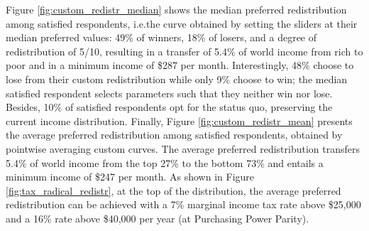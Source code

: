 \documentclass[12pt,english]{article}
\providecommand{\DIFaddtex}[1]{{\protect\color{blue}\uwave{#1}}} %
\providecommand{\DIFaddbegin}{} %
\providecommand{\DIFaddend}{} %
\providecommand{\DIFadd}[1]{\texorpdfstring{\DIFaddtex{#1}}{#1}} %
\providecommand{\DIFaddincludegraphics}[2][]{{\color{blue}\fbox{\DIFOincludegraphics[#1]{#2}}}} %
\DeclareRobustCommand{\DIFaddbegin}{\DIFOaddbegin \let\includegraphics\DIFaddincludegraphics} %
\DeclareRobustCommand{\DIFaddend}{\DIFOaddend \let\includegraphics\DIFOincludegraphics} %
\begin{document}


Figure \ref{fig:custom_redistr_median} shows the median preferred redistribution among satisfied respondents, i.e.\DIFaddbegin \DIFadd{, }\DIFaddend the curve obtained by setting the sliders at their median preferred values: 49\% of winners, 18\% of losers, and a degree of redistribution of 5/10, resulting in a transfer of 5.4\% of world income from rich to poor and in a minimum income of \$287 per month. 
Interestingly, 48\% choose to lose from their custom redistribution while only 9\% choose to win; the median satisfied respondent selects parameters such that they neither win nor lose. Besides, 10\% of satisfied respondents opt for the status quo, preserving the current income distribution. 
Finally, Figure \ref{fig:custom_redistr_mean} presents the average preferred redistribution among satisfied respondents, obtained by pointwise averaging custom curves. 
The average preferred redistribution transfers 5.4\% of world income from the top 27\% to the bottom 73\% and entails a minimum income of \$247 per month.  
As shown in Figure \ref{fig:tax_radical_redistr}, at the top of the distribution, the average preferred redistribution can be achieved with a 7\% marginal income tax rate above \$25,000 and a 16\% rate above \$40,000 per year (at Purchasing Power Parity). 
\end{document}
